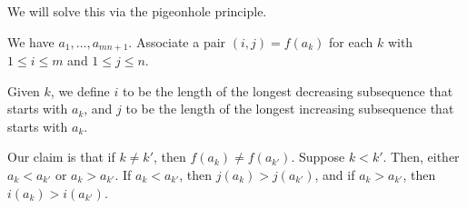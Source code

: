 \documentclass[10pt]{mypackage}
\begin{document}
\begin{solution}
  We will solve this via the pigeonhole principle.\newline

  We have $a_1,\dots,a_{mn + 1}$. Associate a pair $\left( i,j \right) = f\left(a_{k}\right)$ for each $k$ with $1 \leq i \leq m$ and $1 \leq j \leq n$.\newline

  Given $k$, we define $i$ to be the length of the longest decreasing subsequence that starts with $a_k$, and $j$ to be the length of the longest increasing subsequence that starts with $a_k$.\newline

  Our claim is that if $k \neq k'$, then $f\left( a_k \right)\neq f\left( a_{k'} \right)$. Suppose $k < k'$. Then, either $a_{k}  < a_{k'}$ or $a_k > a_{k'}$. If $a_k < a_{k'}$, then $j\left(a_k\right) > j\left( a_{k'} \right)$, and if $a_k > a_{k'}$, then $i\left( a_k \right) > i\left( a_{k'} \right)$.
\end{solution}
\end{document}
